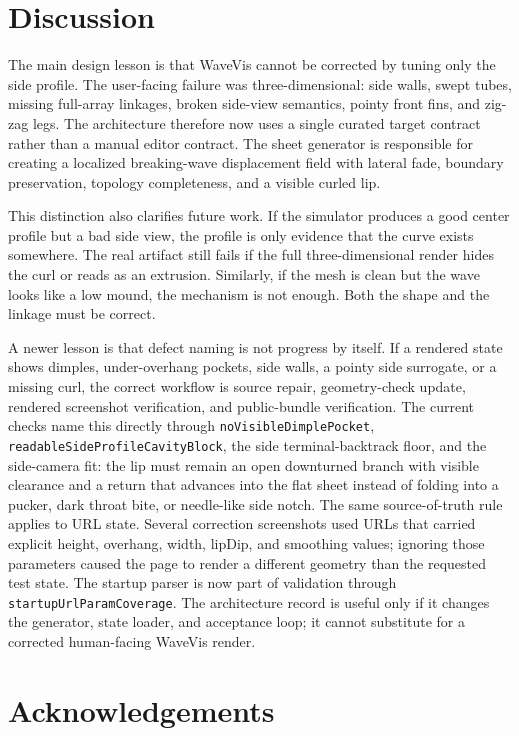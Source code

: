 \documentclass[12pt,letterpaper]{article}
\newcommand{\code}[1]{\texttt{#1}}
\begin{document}
\section{Discussion}

The main design lesson is that WaveVis cannot be corrected by tuning only the side profile. The user-facing failure was three-dimensional: side walls, swept tubes, missing full-array linkages, broken side-view semantics, pointy front fins, and zig-zag legs. The architecture therefore now uses a single curated target contract rather than a manual editor contract. The sheet generator is responsible for creating a localized breaking-wave displacement field with lateral fade, boundary preservation, topology completeness, and a visible curled lip.

This distinction also clarifies future work. If the simulator produces a good center profile but a bad side view, the profile is only evidence that the curve exists somewhere. The real artifact still fails if the full three-dimensional render hides the curl or reads as an extrusion. Similarly, if the mesh is clean but the wave looks like a low mound, the mechanism is not enough. Both the shape and the linkage must be correct.

A newer lesson is that defect naming is not progress by itself. If a rendered state shows dimples, under-overhang pockets, side walls, a pointy side surrogate, or a missing curl, the correct workflow is source repair, geometry-check update, rendered screenshot verification, and public-bundle verification. The current checks name this directly through \code{noVisibleDimplePocket}, \code{readableSideProfileCavityBlock}, the side terminal-backtrack floor, and the side-camera fit: the lip must remain an open downturned branch with visible clearance and a return that advances into the flat sheet instead of folding into a pucker, dark throat bite, or needle-like side notch. The same source-of-truth rule applies to URL state. Several correction screenshots used URLs that carried explicit height, overhang, width, lipDip, and smoothing values; ignoring those parameters caused the page to render a different geometry than the requested test state. The startup parser is now part of validation through \code{startupUrlParamCoverage}. The architecture record is useful only if it changes the generator, state loader, and acceptance loop; it cannot substitute for a corrected human-facing WaveVis render.

\section{Acknowledgements}
\end{document}
